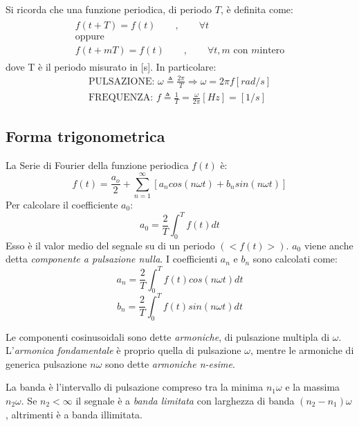 \documentclass[a4paper]{report}
\begin{document}
Si ricorda che una funzione periodica, di periodo $T$, \`e definita
come: 
\begin{eqnarray*}
  \begin{array}{l}
    f(t+T)=f(t)\qquad,\qquad \forall t\\
    \textrm{oppure}\\
    f(t+mT)=f(t)\qquad,\qquad \forall t,m \textrm{ con } m \textrm{
      intero} 
  \end{array}
\end{eqnarray*}
dove T \`e il periodo misurato in [s]. In particolare:
\begin{eqnarray*}
\textrm{PULSAZIONE: } \omega \triangleq \frac{2\pi}{T} \Longrightarrow
\omega = 2\pi f [rad/s]\\
\textrm{FREQUENZA: } f\triangleq \frac{1}{T} = \frac{\omega}{2\pi}
       [Hz] = [1/s]
\end{eqnarray*}

\subsection{Forma trigonometrica}
La Serie di Fourier della funzione periodica $f(t)$ \`e:
\begin{equation}\label{eq:serieDiFourier}
  f(t) = \dfrac{a_o}{2} + \sum_{n = 1}^{\infty} [ a_n cos(n \omega t)
    + b_n sin(n \omega t)]
\end{equation}
Per calcolare il coefficiente $a_0$:
\begin{equation}
  a_0 = \frac{2}{T}\int_0^T f(t) dt
\end{equation}
Esso \`e il valor medio del segnale su di un periodo $(<f(t)>)$. $a_0$
viene anche detta {\em componente a pulsazione nulla}.
I coefficienti $a_n$ e $b_n$ sono calcolati come:
\[
  a_n = \dfrac{2}{T} \int_0^T f(t) cos(n \omega t) dt
\]
\[
  b_n = \dfrac{2}{T} \int_0^T f(t) sin(n \omega t) dt
\]

Le componenti cosinusoidali sono dette {\em armoniche}, di
pulsazione multipla di $\omega$. L'{\em armonica fondamentale} \`e
proprio quella di pulsazione $\omega$, mentre le armoniche di generica
pulsazione $n\omega$ sono dette {\em armoniche n-esime}.

La banda \`e l'intervallo di pulsazione compreso tra la minima $n_1
\omega$ e la massima $n_2 \omega$. Se $n_2 < \infty$ il segnale \`e a
      {\em banda limitata} con larghezza di
      banda $(n_2 - n_1)\omega$, altrimenti \`e a banda illimitata.
      
\end{document}
